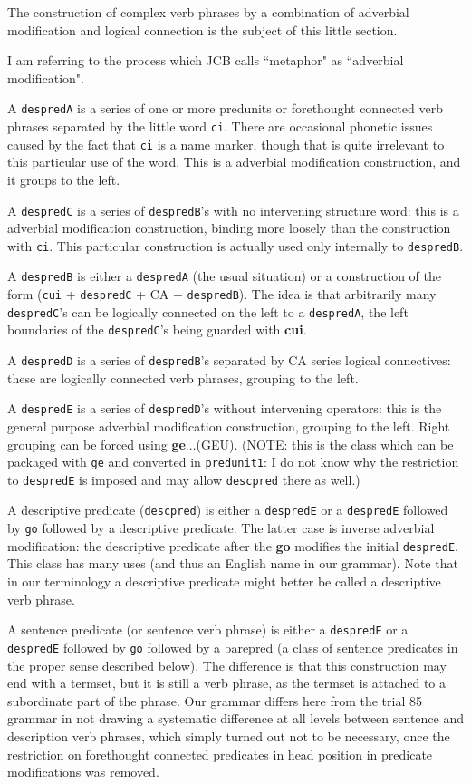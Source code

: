 \documentclass[12pt]{book}
\begin{document}
The construction of complex verb phrases by a combination of adverbial modification and logical connection is the subject of this little section.

I am referring to the process which JCB calls ``metaphor" as ``adverbial modification".

A {\tt despredA} is a series of one or more predunits or forethought connected verb phrases separated by the little word {\tt ci}.  There are occasional phonetic issues caused by the fact that {\tt ci} is a name marker, though that is quite irrelevant to this particular use of the word.  This is a adverbial modification construction, and it groups to the left.

A {\tt despredC} is a series of {\tt despredB}'s with no intervening structure word:  this is a adverbial modification construction, binding more loosely
than the construction with {\tt ci}.  This particular construction is actually used only internally to {\tt despredB}.

A {\tt despredB} is either a {\tt despredA} (the usual situation)
or a construction of the form ({\tt cui} + {\tt despredC} + CA + {\tt despredB}).   The idea is that arbitrarily many {\tt despredC}'s can be logically connected on the left to a {\tt despredA}, the left boundaries of the {\tt despredC}'s being guarded with {\bf cui}.

A {\tt despredD} is a series of {\tt despredB}'s separated by CA series logical connectives:  these are logically connected verb phrases,
grouping to the left.

A {\tt despredE} is a series of {\tt despredD}'s without intervening operators:  this is the general purpose adverbial modification construction, grouping to the left.  Right grouping can be forced using {\bf ge}$\ldots$(GEU).  (NOTE:  this is the class which can be packaged with {\tt ge} and converted in
{\tt predunit1}:  I do not know why the restriction to {\tt despredE} is imposed and may allow {\tt descpred} there as well.)

A descriptive predicate ({\tt descpred}) is either a {\tt despredE} or a {\tt despredE} followed by {\tt go} followed by a descriptive predicate.  The latter case is inverse adverbial modification:  the descriptive predicate after the {\bf go} modifies the initial {\tt despredE}.  This class has many uses (and thus an English name in our grammar).  Note that in our terminology a descriptive predicate might better be called a descriptive verb phrase.

A sentence predicate (or sentence verb phrase) is either a {\tt despredE} or a {\tt despredE} followed by {\tt go} followed by a barepred (a class of sentence predicates in the proper sense described below).  The difference is that this construction may end with a termset, but it is still a verb phrase,
as the termset is attached to a subordinate part of the phrase.  Our grammar differs here from the trial 85 grammar in not drawing a systematic difference at all levels between sentence and description verb phrases, which simply turned out not to be necessary, once the restriction
on forethought connected predicates in head position in predicate modifications was removed.
\end{document}
